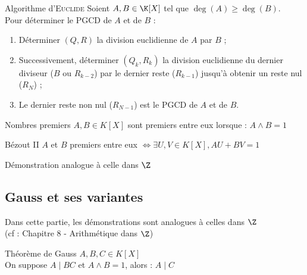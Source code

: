 \documentclass[12pt,a4paper]{report}
\begin{document}
        \begin{application}{Algorithme d'\textsc{Euclide}}{}
        Soient $A, B \in \K[X]$ tel que $\deg(A) \geqslant \deg(B)$.\\
        Pour déterminer le PGCD de $A$ et de $B$ :
        \begin{enumerate}
        \item Déterminer $(Q, R)$ la division euclidienne de $A$ par $B$ ;
        \item Successivement, déterminer $(Q_k, R_k)$ la division euclidienne du dernier diviseur ($B$ ou $R_{k-2}$) par le dernier reste ($R_{k-1}$) jusqu'à obtenir un reste nul ($R_N$) ;
        \item Le dernier reste non nul ($R_{N-1}$) est le PGCD de $A$ et de $B$.
        \end{enumerate}
        \end{application}
    
        \begin{definition}{Nombres premiers}{}
        $A, B \in K[X]$ sont premiers entre eux lorsque : $A\wedge B=1$
        \end{definition}
        
        \begin{theoreme}{Bézout II}{}
        $A$ et $B$ premiers entre eux $\Longleftrightarrow \exists U,V \in K[X], AU + BV = 1$
        \end{theoreme}
        
        \begin{demo}
        Démonstration analogue à celle dans $\Z$
        \end{demo}
        
    \subsection{Gauss et ses variantes}
        \begin{demo}
        Dans cette partie, les démonstrations sont analogues à celles dans $\Z$ \\ (cf : Chapitre 8 - Arithmétique dans $\Z$)
        \end{demo}
        
        \begin{theoreme}{Théorème de Gauss}{}
        $A,B,C \in K[X]$\\
        On suppose $A \mid BC$ et $A\wedge B=1$, alors : $A\mid C$
        \end{theoreme}
        
\end{document}
